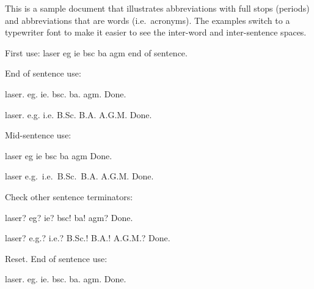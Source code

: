 \documentclass{article}
\begin{document}
This is a sample document that illustrates abbreviations with
full stops (periods) and abbreviations that are words (i.e.\
acronyms). The examples switch to a typewriter font to make it
easier to see the inter-word and inter-sentence spaces.

First use: \gls{laser} \gls{eg} \gls{ie} \gls{bsc} \gls{ba} \gls{agm} end of
sentence.

End of sentence use:

\ttfamily

\gls{laser}. \gls{eg}. \gls{ie}. \gls{bsc}. \gls{ba}. \gls{agm}.
Done.

laser. e.g. i.e. B.Sc. B.A\@. A.G.M\@. Done.

\rmfamily

Mid-sentence use:

\ttfamily

\gls{laser} \gls{eg} \gls{ie} \gls{bsc} \gls{ba} \gls{agm} Done.

laser e.g.\ i.e.\ B.Sc.\ B.A. A.G.M. Done.

\rmfamily

Check other sentence terminators:

\ttfamily

\gls{laser}? \gls{eg}? \gls{ie}? \gls{bsc}! \gls{ba}! \gls{agm}? Done.

laser? e.g.? i.e.? B.Sc.! B.A.! A.G.M.? Done.

\rmfamily

\glsresetall Reset. End of sentence use:

\ttfamily

\gls{laser}. \gls{eg}. \gls{ie}. \gls{bsc}. \gls{ba}. \gls{agm}.
Done.

\rmfamily
\printglossaries
\end{document}
